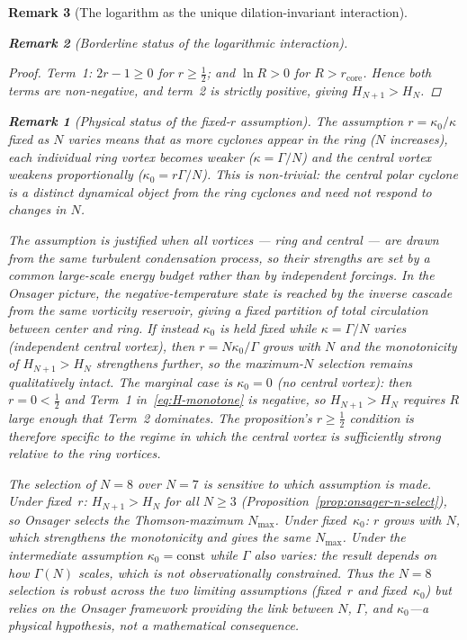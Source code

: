 \documentclass[12pt, a4paper]{article}
\newtheorem{remark}{Remark}[section]
\numberwithin{equation}{section}
\begin{document}
\begin{remark}[The logarithm as the unique dilation-invariant interaction]
\begin{remark}[Borderline status of the logarithmic interaction]
\begin{proof}
\emph{Term~1}: $2r-1 \ge 0$ for $r \ge \tfrac{1}{2}$; and
$\ln R > 0$ for $R > r_{\mathrm{core}}$.  Hence both terms are
non-negative, and term~2 is strictly positive, giving
$H_{N+1} > H_N$.
\end{proof}

\begin{remark}[Physical status of the fixed-$r$ assumption]
\label{rem:fixed-r}
The assumption $r = \kappa_0/\kappa$ fixed as $N$ varies means that
as more cyclones appear in the ring ($N$ increases), each individual
ring vortex becomes weaker ($\kappa = \Gamma/N$) \emph{and the central
vortex weakens proportionally} ($\kappa_0 = r\Gamma/N$).  This is
non-trivial: the central polar cyclone is a distinct dynamical object
from the ring cyclones and need not respond to changes in $N$.

The assumption is justified when all vortices --- ring and central ---
are drawn from the same turbulent condensation process, so their
strengths are set by a common large-scale energy budget rather than
by independent forcings.  In the Onsager picture, the negative-temperature
state is reached by the inverse cascade from the same vorticity
reservoir, giving a fixed partition of total circulation between center
and ring.  If instead $\kappa_0$ is held fixed while $\kappa = \Gamma/N$
varies (independent central vortex), then $r = N\kappa_0/\Gamma$ grows
with $N$ and the monotonicity of $H_{N+1} > H_N$ strengthens further,
so the maximum-$N$ selection remains qualitatively intact.  The
marginal case is $\kappa_0 = 0$ (no central vortex): then
$r = 0 < \tfrac12$ and Term~1 in~\eqref{eq:H-monotone} is
\emph{negative}, so $H_{N+1} > H_N$ requires $R$ large enough that
Term~2 dominates.  The proposition's $r \ge \tfrac{1}{2}$ condition
is therefore specific to the regime in which the central vortex is
sufficiently strong relative to the ring vortices.

The selection of $N = 8$ over $N = 7$ is sensitive to which assumption
is made.  Under fixed~$r$: $H_{N+1} > H_N$ for all $N \ge 3$
(Proposition~\ref{prop:onsager-n-select}), so Onsager selects the
Thomson-maximum $N_{\max}$.  Under fixed~$\kappa_0$: $r$ grows with
$N$, which strengthens the monotonicity and gives the same $N_{\max}$.
Under the intermediate assumption $\kappa_0 = \mathrm{const}$ while
$\Gamma$ also varies: the result depends on how $\Gamma(N)$ scales,
which is not observationally constrained.  Thus the $N = 8$
selection is robust across the two limiting assumptions (fixed~$r$
and fixed~$\kappa_0$) but relies on the Onsager framework providing
the link between $N$, $\Gamma$, and $\kappa_0$---a physical
hypothesis, not a mathematical consequence.


\end{remark}
\end{remark}
\end{remark}
\end{document}
